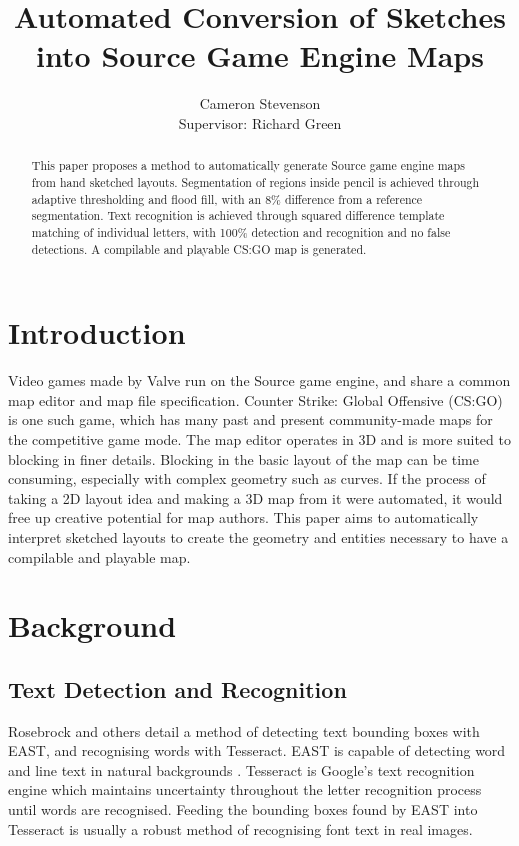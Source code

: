 \documentclass[11pt]{IEEEtran}
\begin{document}
\title{Automated Conversion of Sketches into Source Game Engine Maps}
\author{Cameron Stevenson\\[0.5cm]{\small Supervisor: Richard Green}}
 
 \maketitle
 
\begin{abstract}
This paper proposes a method to automatically generate Source game engine maps from hand sketched layouts. Segmentation of regions inside pencil is achieved through adaptive thresholding and flood fill, with an 8\% difference from a reference segmentation. Text recognition is achieved through squared difference template matching of individual letters, with 100\% detection and recognition and no false detections. A compilable and playable CS:GO map is generated.
\end{abstract}

\section{Introduction}

Video games made by Valve run on the Source game engine, and share a common map editor and map file specification. Counter Strike: Global Offensive (CS:GO) is one such game, which has many past and present community-made maps for the competitive game mode. The map editor operates in 3D and is more suited to blocking in finer details. Blocking in the basic layout of the map can be time consuming, especially with complex geometry such as curves. If the process of taking a 2D layout idea and making a 3D map from it were automated, it would free up creative potential for map authors. This paper aims to automatically interpret sketched layouts to create the geometry and entities necessary to have a compilable and playable map.

\section{Background}
\subsection{Text Detection and Recognition}
Rosebrock \cite{rosebrock2018opencv} and others detail a method of detecting text bounding boxes with EAST, and recognising words with Tesseract. EAST is capable of detecting word and line text in natural backgrounds \cite{zhou2017east}. Tesseract \cite{smith2007overview} is Google's text recognition engine which maintains uncertainty throughout the letter recognition process until words are recognised. Feeding the bounding boxes found by EAST into Tesseract is usually a robust method of recognising font text in real images.
\end{document}
